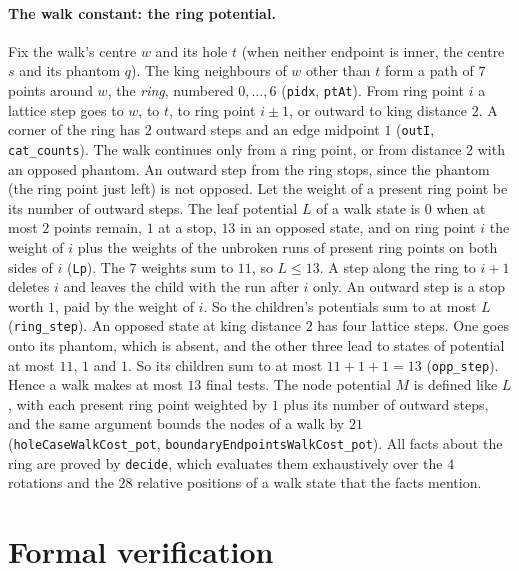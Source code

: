 \documentclass[11pt]{article}
\theoremstyle{plain}
\theoremstyle{definition}
\theoremstyle{remark}
\newcommand{\lean}[1]{\texttt{#1}}
\begin{document}
\paragraph{The walk constant: the ring potential.}
\label{par:ring}
Fix the walk's centre $w$ and its hole $t$ (when neither endpoint is inner, the centre $s$ and its
phantom $q$).
The king neighbours of $w$ other than $t$ form a path of $7$ points around $w$, the \emph{ring},
numbered $0,\dots,6$ (\lean{pidx}, \lean{ptAt}).
From ring point $i$ a lattice step goes to $w$, to $t$, to ring point $i\pm1$, or outward to king
distance $2$.
A corner of the ring has $2$ outward steps and an edge midpoint $1$ (\lean{outI},
\lean{cat\_counts}).
The walk continues only from a ring point, or from distance $2$ with an opposed phantom.
An outward step from the ring stops, since the phantom (the ring point just left) is not opposed.
Let the weight of a present ring point be its number of outward steps.
The leaf potential $L$ of a walk state is $0$ when at most $2$ points remain, $1$ at a stop, $13$ in
an opposed state, and on ring point $i$ the weight of $i$ plus the weights of the unbroken runs of
present ring points on both sides of $i$ (\lean{Lp}).
The $7$ weights sum to $11$, so $L\le13$.
A step along the ring to $i+1$ deletes $i$ and leaves the child with the run after $i$ only.
An outward step is a stop worth $1$, paid by the weight of $i$.
So the children's potentials sum to at most $L$ (\lean{ring\_step}).
An opposed state at king distance $2$ has four lattice steps.
One goes onto its phantom, which is absent, and the other three lead to states of potential at most
$11$, $1$ and $1$.
So its children sum to at most $11+1+1=13$ (\lean{opp\_step}).
Hence a walk makes at most $13$ final tests.
The node potential $M$ is defined like $L$, with each present ring point weighted by $1$ plus its
number of outward steps, and the same argument bounds the nodes of a walk by $21$
(\lean{holeCaseWalkCost\_pot}, \lean{boundaryEndpointsWalkCost\_pot}).
All facts about the ring are proved by \lean{decide}, which evaluates them exhaustively over the $4$
rotations and the $28$ relative positions of a walk state that the facts mention.



\section{Formal verification}
\label{sec:lean}
\end{document}
